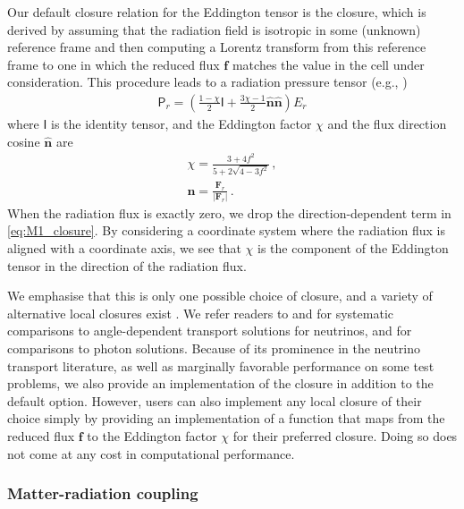 \documentclass[fleqn,usenatbib]{mnras}
\begin{document}
Our default closure relation for the Eddington tensor is the \cite{Levermore_1984} closure, which is derived by assuming that the radiation field is isotropic in some (unknown) reference frame and then computing a Lorentz transform from this reference frame to one in which the reduced flux $\mathbf{f}$ matches the value in the cell under consideration. This procedure leads to a radiation pressure tensor (e.g., \citealt{Gonzalez_2007,Rosdahl_2013,Skinner_2013})
\begin{align}
\label{eq:M1_closure}
\mathsf{P}_r = \left( \frac{1 - \chi}{2} \mathsf{I} + \frac{3\chi - 1}{2} \mathbf{\hat n} \mathbf{\hat n} \right) E_r
\end{align}
where $\mathsf{I}$ is the identity tensor, and the Eddington factor $\chi$ and the flux direction cosine $\mathbf{\hat n}$ are
\begin{align}
\chi = \frac{3 + 4f^2}{5 + 2 \sqrt{4 - 3 f^2}} \, , \\
\mathbf{\hat n} = \frac{\mathbf{F}_r}{|\mathbf{F}_r|} \, .
\end{align}
When the radiation flux is exactly zero, we drop the direction-dependent term in \autoref{eq:M1_closure}. By considering a coordinate system where the radiation flux is aligned with a coordinate axis, we see that $\chi$ is the component of the Eddington tensor in the direction of the radiation flux.

We emphasise that this is only one possible choice of closure, and a variety of alternative local closures exist \citep[e.g.,][]{Minerbo_1978,Levermore_1981}. We refer readers to \citet{Janka_1992} and \citet{Koerner_1992} for systematic comparisons to angle-dependent transport solutions for neutrinos, and \citet{Olson_2000} for comparisons to photon solutions. Because of its prominence in the neutrino transport literature, as well as marginally favorable performance on some test problems, we also provide an implementation of the \cite{Minerbo_1978} closure in addition to the default \citet{Levermore_1984} option. However, users can also implement any local closure of their choice simply by providing an implementation of a function that maps from the reduced flux $\mathbf{f}$ to the Eddington factor $\chi$ for their preferred closure. Doing so does not come at any cost in computational performance.

\subsubsection{Matter-radiation coupling}
\label{sssec:coupling}
\end{document}
